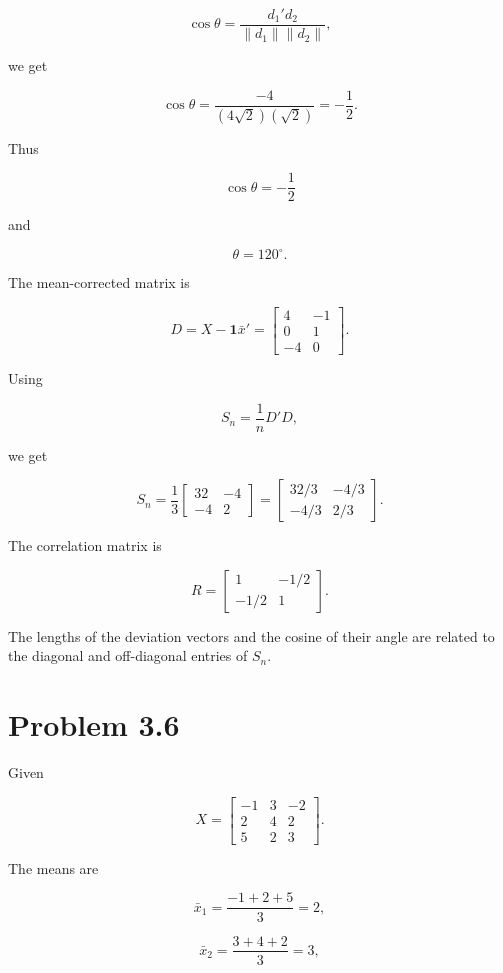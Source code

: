 \documentclass[12pt]{article}
\begin{document}
$$
\cos\theta
=
\frac{d_1'd_2}{\|d_1\|\|d_2\|},
$$

we get

$$
\cos\theta
=
\frac{-4}{(4\sqrt{2})(\sqrt{2})}
=-\frac12.
$$

Thus

$$
\boxed{\cos\theta=-\frac12}
$$

and

$$
\boxed{\theta=120^\circ}.
$$

The mean-corrected matrix is

$$
D=X-\mathbf{1}\bar{x}'
=
\begin{bmatrix}
4&-1\\
0&1\\
-4&0
\end{bmatrix}.
$$

Using

$$
S_n=\frac{1}{n}D'D,
$$

we get

$$
S_n
=
\frac13
\begin{bmatrix}
32&-4\\
-4&2
\end{bmatrix}
=
\begin{bmatrix}
32/3&-4/3\\
-4/3&2/3
\end{bmatrix}.
$$

The correlation matrix is

$$
\boxed{
R=
\begin{bmatrix}
1&-1/2\\
-1/2&1
\end{bmatrix}}.
$$

The lengths of the deviation vectors and the cosine of their angle are related to the diagonal and off-diagonal entries of $S_n$.

\newpage

\section*{Problem 3.6}

Given

$$
X=
\begin{bmatrix}
-1&3&-2\\
2&4&2\\
5&2&3
\end{bmatrix}.
$$

The means are

$$
\bar{x}_1=\frac{-1+2+5}{3}=2,
$$

$$
\bar{x}_2=\frac{3+4+2}{3}=3,
$$
\end{document}
